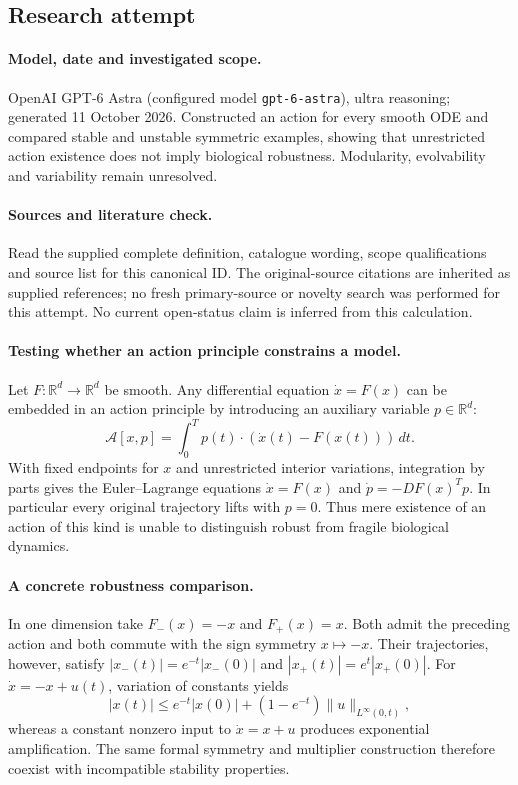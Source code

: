 \documentclass[11pt]{article}
\begin{document}
\subsection{Research attempt}
\paragraph{Model, date and investigated scope.}
OpenAI GPT-6 Astra (configured model \texttt{gpt-6-astra}), ultra reasoning; generated 11 October 2026. Constructed an action for every smooth ODE and compared stable and unstable symmetric examples, showing that unrestricted action existence does not imply biological robustness. Modularity, evolvability and variability remain unresolved.

\paragraph{Sources and literature check.}
Read the supplied complete definition, catalogue wording, scope qualifications and source list for this canonical ID. The original-source citations are inherited as supplied references; no fresh primary-source or novelty search was performed for this attempt. No current open-status claim is inferred from this calculation.

\paragraph{Testing whether an action principle constrains a model.}Let \(F:\mathbb R^d\to\mathbb R^d\) be smooth. Any differential equation \(\dot x=F(x)\) can be embedded in an action principle by introducing an auxiliary variable \(p\in\mathbb R^d\):
\[\mathcal A[x,p]=\int_0^T p(t)\cdot(\dot x(t)-F(x(t)))\,dt.\]
With fixed endpoints for \(x\) and unrestricted interior variations, integration by parts gives the Euler--Lagrange equations \(\dot x=F(x)\) and \(\dot p=-DF(x)^Tp\). In particular every original trajectory lifts with \(p=0\). Thus mere existence of an action of this kind is unable to distinguish robust from fragile biological dynamics.
\paragraph{A concrete robustness comparison.}In one dimension take \(F_-(x)=-x\) and \(F_+(x)=x\). Both admit the preceding action and both commute with the sign symmetry \(x\mapsto-x\). Their trajectories, however, satisfy \(|x_-(t)|=e^{-t}|x_-(0)|\) and \(|x_+(t)|=e^t|x_+(0)|\). For \(\dot x=-x+u(t)\), variation of constants yields
\[|x(t)|\le e^{-t}|x(0)|+(1-e^{-t})\|u\|_{L^\infty(0,t)},\]
whereas a constant nonzero input to \(\dot x=x+u\) produces exponential amplification. The same formal symmetry and multiplier construction therefore coexist with incompatible stability properties.
\end{document}
